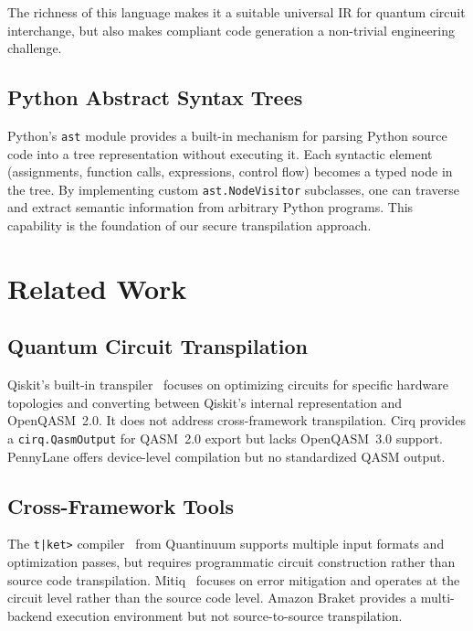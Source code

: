 \documentclass[conference]{IEEEtran}
\begin{document}
The richness of this language makes it a suitable universal IR for quantum circuit interchange, but also makes compliant code generation a non-trivial engineering challenge.

\subsection{Python Abstract Syntax Trees}

Python's \texttt{ast} module provides a built-in mechanism for parsing Python source code into a tree representation without executing it. Each syntactic element (assignments, function calls, expressions, control flow) becomes a typed node in the tree. By implementing custom \texttt{ast.NodeVisitor} subclasses, one can traverse and extract semantic information from arbitrary Python programs. This capability is the foundation of our secure transpilation approach.

\section{Related Work}
\label{sec:related}

\subsection{Quantum Circuit Transpilation}

Qiskit's built-in transpiler~\cite{qiskit2024} focuses on optimizing circuits for specific hardware topologies and converting between Qiskit's internal representation and OpenQASM~2.0. It does not address cross-framework transpilation. Cirq provides a \texttt{cirq.QasmOutput} for QASM~2.0 export but lacks OpenQASM~3.0 support. PennyLane offers device-level compilation but no standardized QASM output.

\subsection{Cross-Framework Tools}

The \texttt{t|ket>} compiler~\cite{sivarajah2020tket} from Quantinuum supports multiple input formats and optimization passes, but requires programmatic circuit construction rather than source code transpilation. Mitiq~\cite{larose2022mitiq} focuses on error mitigation and operates at the circuit level rather than the source code level. Amazon Braket provides a multi-backend execution environment but not source-to-source transpilation.
\end{document}

